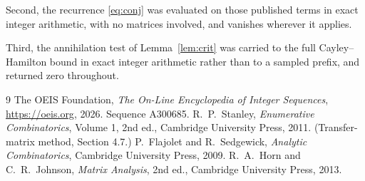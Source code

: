 \documentclass[11pt,a4paper]{article}
\theoremstyle{plain}
\theoremstyle{definition}
\begin{document}
Second, the recurrence \eqref{eq:conj} was evaluated on those published terms in exact
integer arithmetic, with no matrices involved, and vanishes wherever it applies.

Third, the annihilation test of Lemma~\ref{lem:crit} was carried to the full
Cayley--Hamilton bound in exact integer arithmetic rather than to a sampled prefix, and
returned zero throughout.

\begin{thebibliography}{9}
 The OEIS Foundation, \emph{The On-Line Encyclopedia of Integer
Sequences}, \url{https://oeis.org}, 2026. Sequence A300685.
 R.~P.~Stanley, \emph{Enumerative Combinatorics}, Volume 1, 2nd ed.,
Cambridge University Press, 2011. (Transfer-matrix method, Section 4.7.)
 P.~Flajolet and R.~Sedgewick, \emph{Analytic Combinatorics}, Cambridge
University Press, 2009.
 R.~A.~Horn and C.~R.~Johnson, \emph{Matrix Analysis}, 2nd ed., Cambridge
University Press, 2013.
\end{thebibliography}
\end{document}
